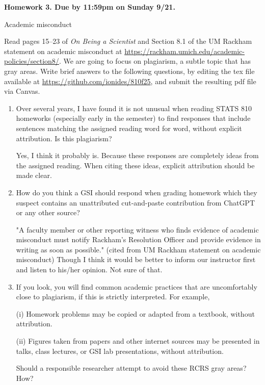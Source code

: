 \documentclass[12pt]{article}
\begin{document}
\begin{center}\bf
Homework 3. Due by 11:59pm on Sunday 9/21.

Academic misconduct

\end{center}
Read pages 15--23 of {\em On Being a Scientist} and Section 8.1 of the UM Rackham statement on academic misconduct at \url{https://rackham.umich.edu/academic-policies/section8/}. We are going to focus on plagiarism, a subtle topic that has gray areas. Write brief answers to the following questions, by editing the tex file available at \url{https://github.com/ionides/810f25}, and submit the resulting pdf file via Canvas. 

\begin{enumerate}

\item Over several years, I have found it is not unusual when reading STATS 810 homeworks (especially early in the semester) to find responses that include sentences matching the assigned reading word for word, without explicit attribution. Is this plagiarism?

Yes, I think it probably is. Because these responses are completely ideas from the assigned reading. When citing these ideas, explicit attribution should be made clear.

\item How do you think a GSI should respond when grading homework which they suspect contains an unattributed cut-and-paste contribution from ChatGPT or any other source?

"A faculty member or other reporting witness who finds evidence of academic misconduct must notify Rackham’s Resolution Officer and provide evidence in writing as soon as possible." (cited from UM Rackham statement on academic misconduct) Though I think it would be better to inform our instructor first and listen to his/her opinion. Not sure of that.

\item If you look, you will find common academic practices that are uncomfortably close to plagiarism, if this is strictly interpreted. For example,

(i) Homework problems may be copied or adapted from a textbook, without attribution.

(ii) Figures taken from papers and other internet sources may be presented in talks, class lectures, or GSI lab presentations, without attribution.

Should a responsible researcher attempt to avoid these RCRS gray areas? How?
  

\end{enumerate}
\end{document}
